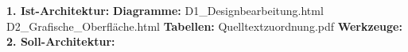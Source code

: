 \textbf{1. Ist-Architektur:}\newline
\indent \textbf{Diagramme:}\newline
\indent \indent D1\_Designbearbeitung.html\newline
\indent \indent D2\_Grafische\_Oberfläche.html\newline
\indent \textbf{Tabellen:}\newline
\indent \indent Quelltextzuordnung.pdf\newline
\indent \textbf{Werkzeuge:}\newline
\textbf{2. Soll-Architektur:}